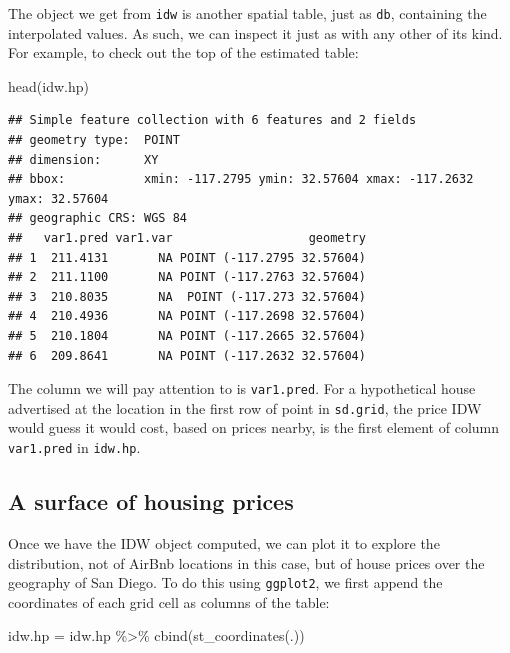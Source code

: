 \documentclass[
]{book}
\newenvironment{Shaded}{\begin{snugshade}}{\end{snugshade}}
\newcommand{\FunctionTok}[1]{\textcolor[rgb]{0.00,0.00,0.00}{#1}}
\newcommand{\NormalTok}[1]{#1}
\newcommand{\OtherTok}[1]{\textcolor[rgb]{0.56,0.35,0.01}{#1}}
\newcommand{\SpecialCharTok}[1]{\textcolor[rgb]{0.00,0.00,0.00}{#1}}
\begin{document}
The object we get from \texttt{idw} is another spatial table, just as \texttt{db}, containing the interpolated values. As such, we can inspect it just as with any other of its kind. For example, to check out the top of the estimated table:

\begin{Shaded}
\begin{Highlighting}[]
\FunctionTok{head}\NormalTok{(idw.hp)}
\end{Highlighting}
\end{Shaded}

\begin{verbatim}
## Simple feature collection with 6 features and 2 fields
## geometry type:  POINT
## dimension:      XY
## bbox:           xmin: -117.2795 ymin: 32.57604 xmax: -117.2632 ymax: 32.57604
## geographic CRS: WGS 84
##   var1.pred var1.var                   geometry
## 1  211.4131       NA POINT (-117.2795 32.57604)
## 2  211.1100       NA POINT (-117.2763 32.57604)
## 3  210.8035       NA  POINT (-117.273 32.57604)
## 4  210.4936       NA POINT (-117.2698 32.57604)
## 5  210.1804       NA POINT (-117.2665 32.57604)
## 6  209.8641       NA POINT (-117.2632 32.57604)
\end{verbatim}

The column we will pay attention to is \texttt{var1.pred}. For a hypothetical house advertised at the location in the first row of point in \texttt{sd.grid}, the price IDW would guess it would cost, based on prices nearby, is the first element of column \texttt{var1.pred} in \texttt{idw.hp}.

\hypertarget{a-surface-of-housing-prices}{%
\subsection{A surface of housing prices}\label{a-surface-of-housing-prices}}

Once we have the IDW object computed, we can plot it to explore the distribution, not of AirBnb locations in this case, but of house prices over the geography of San Diego. To do this using \texttt{ggplot2}, we first append the coordinates of each grid cell as columns of the table:

\begin{Shaded}
\begin{Highlighting}[]
\NormalTok{idw.hp }\OtherTok{=}\NormalTok{ idw.hp }\SpecialCharTok{\%\textgreater{}\%}
  \FunctionTok{cbind}\NormalTok{(}\FunctionTok{st\_coordinates}\NormalTok{(.))}
\end{Highlighting}
\end{Shaded}
\end{document}
